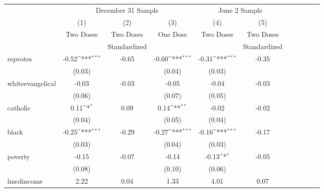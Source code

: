 \begin{minipage}{6.5in}
	\centering
	\def\sym#1{\ifmmode^{#1}\else\(^{#1}\)\fi}
	\def\arraystretch{1.1}
	\begin{tabular*}{\textwidth}{@{\extracolsep{\fill}}l*{5}{cc}}
	\hline\hline
				&\multicolumn{3}{c}{December 31 Sample}     & \multicolumn{2}{c}{June 2 Sample}\\
				\cmidrule{2-4}\cmidrule(l{1ex}r{1ex}){5-6}
	            &\multicolumn{1}{c}{(1)}         &\multicolumn{1}{c}{(2)}&\multicolumn{1}{c}{(3)}         &\multicolumn{1}{c}{(4)}         &\multicolumn{1}{c}{(5)}\\
	            &        \multirow{2}{*}{Two Doses}        &    Two Doses    &       \multirow{2}{*}{One Dose}         &        \multirow{2}{*}{Two Doses}         &        Two Doses\\
	            &&Standardized&&&Standardized\\ 
	\hline
	\multirow{2}{*}{repvotes}&       -0.52\sym{***}&       -0.65&       -0.60\sym{***}&       -0.31\sym{***}&       -0.35\\
	            &      (0.03)         &            &      (0.04)         &      (0.03)         &            \\
	\multirow{2}{*}{whiteevangelical}&       -0.03         &       -0.03&       -0.05         &       -0.04         &       -0.03\\
	            &      (0.06)         &            &      (0.07)         &      (0.05)         &            \\
	\multirow{2}{*}{catholic}    &        0.11\sym{*}  &        0.09&        0.14\sym{**} &       -0.02         &       -0.02\\
	            &      (0.04)         &            &      (0.05)         &      (0.04)         &            \\
	\multirow{2}{*}{black}       &       -0.25\sym{***}&       -0.29&       -0.27\sym{***}&       -0.16\sym{***}&       -0.17\\
	            &      (0.03)         &            &      (0.04)         &      (0.03)         &            \\
	\multirow{2}{*}{poverty}     &       -0.15         &       -0.07&       -0.14         &       -0.13\sym{*}  &       -0.05\\
	            &      (0.08)         &            &      (0.10)         &      (0.06)         &            \\
	\multirow{2}{*}{lmedincome}  &        2.22         &        0.04&        1.33         &        4.01         &        0.07\\

\end{tabular*}
\end{minipage}
